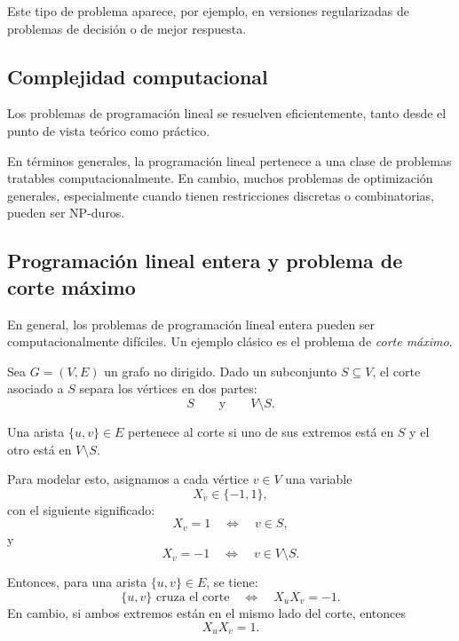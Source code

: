 Este tipo de problema aparece, por ejemplo, en versiones regularizadas de problemas de decisión o de mejor respuesta.

\subsection{Complejidad computacional}

Los problemas de programación lineal se resuelven eficientemente, tanto desde el punto de vista teórico como práctico.

\begin{remark}
En términos generales, la programación lineal pertenece a una clase de problemas tratables computacionalmente. En cambio, muchos problemas de optimización generales, especialmente cuando tienen restricciones discretas o combinatorias, pueden ser NP-duros.
\end{remark}



\subsection{Programación lineal entera y problema de corte máximo}

En general, los problemas de programación lineal entera pueden ser computacionalmente difíciles. Un ejemplo clásico es el problema de \emph{corte máximo}.

Sea \(G=(V,E)\) un grafo no dirigido. Dado un subconjunto \(S\subseteq V\), el corte asociado a \(S\) separa los vértices en dos partes:
\[
    S
    \qquad \text{y} \qquad
    V\setminus S.
\]

Una arista \(\{u,v\}\in E\) pertenece al corte si uno de sus extremos está en \(S\) y el otro está en \(V\setminus S\).

Para modelar esto, asignamos a cada vértice \(v\in V\) una variable
\[
    X_v\in\{-1,1\},
\]
con el siguiente significado:
\[
    X_v=1
    \quad \Longleftrightarrow \quad
    v\in S,
\]
y
\[
    X_v=-1
    \quad \Longleftrightarrow \quad
    v\in V\setminus S.
\]

Entonces, para una arista \(\{u,v\}\in E\), se tiene:
\[
    \{u,v\} \text{ cruza el corte}
    \quad \Longleftrightarrow \quad
    X_uX_v=-1.
\]
En cambio, si ambos extremos están en el mismo lado del corte, entonces
\[
    X_uX_v=1.
\]

